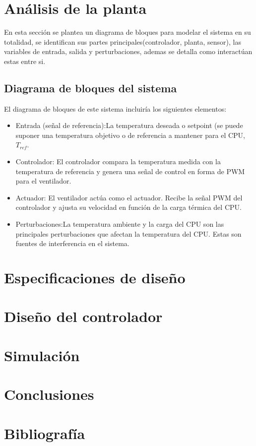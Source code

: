 \documentclass[12pt]{article}
\begin{document}
\section{Análisis de la planta}
	 En esta sección se plantea un diagrama de bloques para modelar el sistema en su totalidad, se identifican sus partes principales(controlador, planta, sensor), las variables de entrada, salida y perturbaciones, ademas se detalla como interactúan estas entre si.
	 \subsection{Diagrama de bloques del sistema}
	 El diagrama de bloques de este sistema incluiría los siguientes elementos:
	 \begin{itemize}
	 	\item Entrada (señal de referencia):La temperatura deseada o setpoint (se puede suponer una temperatura objetivo o de referencia a mantener para el CPU, $T_{ref}$.
	 	\item Controlador: El controlador compara la temperatura medida con la temperatura de referencia y genera una señal de control en forma de PWM para el ventilador.
	 	\item Actuador: El ventilador actúa como el actuador. Recibe la señal PWM del controlador y ajusta su velocidad en función de la carga térmica del CPU.
	 	\item Perturbaciones:La temperatura ambiente y la carga del CPU son las principales perturbaciones que afectan la temperatura del CPU. Estas son fuentes de interferencia en el sistema.
	 	\
	 \end{itemize}
	 
	 
\section{Especificaciones de diseño}

	
\section{Diseño del controlador}
\section{Simulación}
\section{Conclusiones}
\section{Bibliografía}
\end{document}
